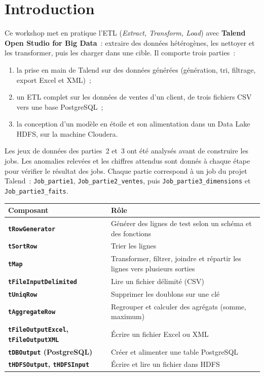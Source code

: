 \newpage
\section*{Introduction}
{}

\noindent Ce workshop met en pratique l'ETL (\textit{Extract, Transform, Load}) avec \textbf{Talend Open Studio for Big Data}~: extraire des données hétérogènes, les nettoyer et les transformer, puis les charger dans une cible. Il comporte trois parties~:
\begin{enumerate}
	\item la prise en main de Talend sur des données générées (génération, tri, filtrage, export Excel et XML)~;
	\item un ETL complet sur les données de ventes d'un client, de trois fichiers CSV vers une base PostgreSQL~;
	\item la conception d'un modèle en étoile et son alimentation dans un Data Lake HDFS, sur la machine Cloudera.
\end{enumerate}

\noindent Les jeux de données des parties~2 et~3 ont été analysés avant de construire les jobs. Les anomalies relevées et les chiffres attendus sont donnés à chaque étape pour vérifier le résultat des jobs. Chaque partie correspond à un job du projet Talend~: \texttt{Job\_partie1}, \texttt{Job\_partie2\_ventes}, puis \texttt{Job\_partie3\_dimensions} et \texttt{Job\_partie3\_faits}.

\vspace{0.3cm}
\begin{center}
\small
\begin{tabularx}{\textwidth}{>{\bfseries}l >{\raggedright\arraybackslash}X}
\toprule
Composant & Rôle \\
\midrule
\texttt{tRowGenerator} & Générer des lignes de test selon un schéma et des fonctions \\
\texttt{tSortRow} & Trier les lignes \\
\texttt{tMap} & Transformer, filtrer, joindre et répartir les lignes vers plusieurs sorties \\
\texttt{tFileInputDelimited} & Lire un fichier délimité (CSV) \\
\texttt{tUniqRow} & Supprimer les doublons sur une clé \\
\texttt{tAggregateRow} & Regrouper et calculer des agrégats (somme, maximum) \\
\texttt{tFileOutputExcel}, \texttt{tFileOutputXML} & Écrire un fichier Excel ou XML \\
\texttt{tDBOutput} (PostgreSQL) & Créer et alimenter une table PostgreSQL \\
\texttt{tHDFSOutput}, \texttt{tHDFSInput} & Écrire et lire un fichier dans HDFS \\
\bottomrule
\end{tabularx}
\end{center}

